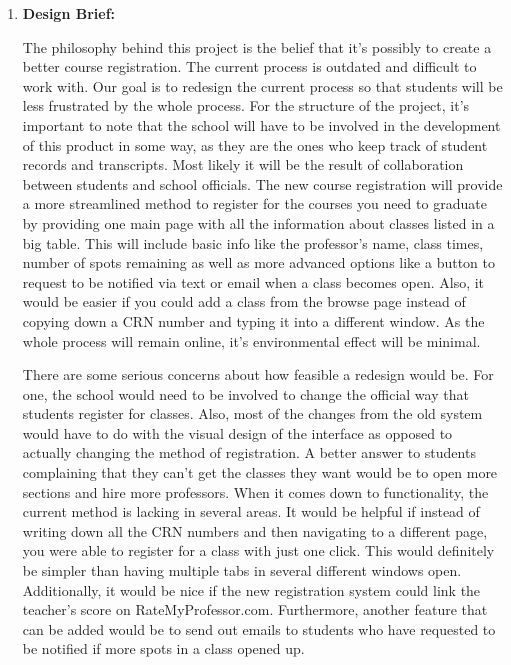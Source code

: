 \documentclass[11pt]{article}
\begin{document}
\begin{enumerate}
\begin{enumerate}[1]
\item
\textbf{Design Brief:}

\setlength{\parindent}{10ex} The philosophy behind this project is the belief that it's possibly to create a better course registration.  The current process is outdated and difficult to work with.  Our goal is to redesign the current process so that students will be less frustrated by the whole process.  For the structure of the project, it's important to note that the school will have to be involved in the development of this product in some way, as they are the ones who keep track of student records and transcripts.  Most likely it will be the result of collaboration between students and school officials.  The new course registration will provide a more streamlined method to register for the courses you need to graduate by providing one main page with all the information about classes listed in a big table.  This will include basic info like the professor's name, class times, number of spots remaining as well as more advanced options like a button to request to be notified via text or email when a class becomes open.  Also, it would be easier if you could add a class from the browse page instead of copying down a CRN number and typing it into a different window.  As the whole process will remain online, it's environmental effect will be minimal.  

\indent There are some serious concerns about how feasible a redesign would be.  For one, the school would need to be involved to change the official way that students register for classes.  Also, most of the changes from the old system would have to do with the visual design of the interface as opposed to actually changing the method of registration.  A better answer to students complaining that they can't get the classes they want would be to open more sections and hire more professors.  When it comes down to functionality, the current method is lacking in several areas.  It would be helpful if instead of writing down all the CRN numbers and then navigating to a different page, you were able to register for a class with just one click.  This would definitely be simpler than having multiple tabs in several different windows open.  Additionally, it would be nice if the new registration system could link the teacher's score on RateMyProfessor.com.  Furthermore, another feature that can be added would be to send out emails to students who have requested to be notified if more spots in a class opened up.  


\end{enumerate}

\end{enumerate}
\end{document}
